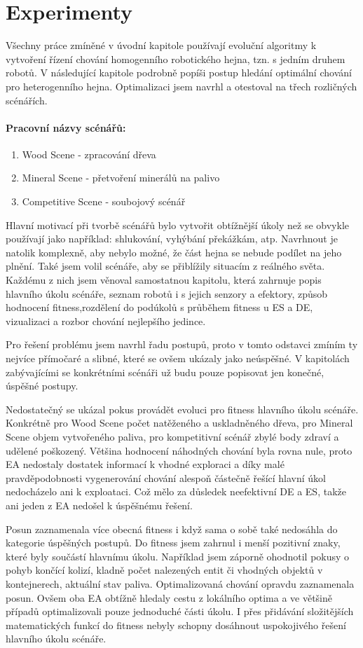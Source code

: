 \chapter{Experimenty}
\label{chap:experimenty}
Všechny práce zmíněné v úvodní kapitole používají evoluční algoritmy k vytvoření řízení chování homogenního robotického hejna, tzn. s jedním druhem robotů. V následující kapitole podrobně popíši postup hledání optimální chování pro heterogenního hejna. Optimalizaci jsem navrhl a otestoval na třech rozličných scénářích. 
\par
\subsubsection{Pracovní názvy scénářů:}
\begin{enumerate}
	\item Wood Scene - zpracování dřeva
	\item Mineral Scene - přetvoření minerálů na palivo 
	\item Competitive Scene - soubojový scénář
\end{enumerate}

Hlavní motivací při tvorbě scénářů bylo vytvořit obtížnější úkoly než se obvykle používají jako například: shlukování, vyhýbání překážkám, atp. Navrhnout je natolik komplexně, aby nebylo možné, že část hejna se nebude podílet na jeho plnění. Také jsem volil scénáře, aby se přiblížily situacím z reálného světa. Každému z nich jsem věnoval samostatnou kapitolu, která zahrnuje popis hlavního úkolu scénáře, seznam robotů i s jejich senzory a efektory, způsob hodnocení fitness,rozdělení do podúkolů s průběhem fitness u ES a DE, vizualizaci a rozbor chování nejlepšího jedince.  
\par
Pro řešení problému jsem navrhl řadu postupů, proto v tomto odstavci zmíním ty nejvíce přímočaré a slibné, které se ovšem ukázaly  jako neúspěšné. V kapitolách zabývajícími se konkrétními scénáři už budu pouze popisovat jen konečné, úspěšné postupy.
\par
Nedostatečný se ukázal pokus provádět evoluci pro fitness hlavního úkolu scénáře. Konkrétně pro Wood Scene počet natěženého a uskladněného dřeva, pro Mineral Scene objem vytvořeného paliva, pro kompetitivní scénář zbylé body zdraví a udělené poškozený. Většina hodnocení náhodných chování byla rovna nule, proto EA nedostaly dostatek informací k vhodné exploraci a díky malé pravděpodobnosti vygenerování chování alespoň částečně řešící hlavní úkol nedocházelo ani k exploataci. Což mělo za důsledek neefektivní  DE a ES, takže ani jeden z EA nedošel k úspěšnému řešení. 
\par
Posun zaznamenala více obecná fitness i když sama o sobě také nedosáhla do kategorie úspěšných postupů. Do fitness jsem zahrnul i menší pozitivní znaky, které byly součástí hlavnímu úkolu. Například jsem záporně ohodnotil pokusy o pohyb končící kolizí, kladně počet nalezených entit či vhodných objektů v kontejnerech, aktuální stav paliva. Optimalizovaná chování opravdu zaznamenala posun. Ovšem oba EA obtížně hledaly cestu z lokálního optima a ve většině případů optimalizovali pouze jednoduché části úkolu. I přes přidávání složitějších matematických funkcí do fitness nebyly schopny dosáhnout uspokojivého řešení hlavního úkolu scénáře.  
